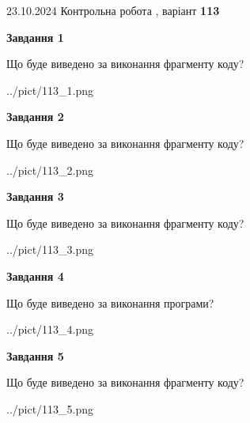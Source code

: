 \documentclass[12pt, ukrainian]{article}
\begin{document}
{\Large{23.10.2024 Контрольна робота , варіант  \No \textbf { 113 }\par}}
{
\begin {large}
{\begin {center}\textbf{Завдання 1}\end {center}}

Що буде виведено за виконання фрагменту коду?\par
\begin{center}
	{../pict/113_1.png}
\end{center}
\newpage

{\begin {center}\textbf{Завдання 2}\end {center}}

Що буде виведено за виконання фрагменту коду?\par
\begin{center}
	{../pict/113_2.png}
\end{center}
\newpage

{\begin {center}\textbf{Завдання 3}\end {center}}

Що буде виведено за виконання фрагменту коду?\par
\begin{center}
	{../pict/113_3.png}
\end{center}
\newpage

{\begin {center}\textbf{Завдання 4}\end {center}}

Що буде виведено за виконання програми?\par
\begin{center}
	{../pict/113_4.png}
\end{center}
\newpage

{\begin {center}\textbf{Завдання 5}\end {center}}

Що буде виведено за виконання фрагменту коду?\par
\begin{center}
	{../pict/113_5.png}
\end{center}
\newpage


\end{large}}
\end{document}
